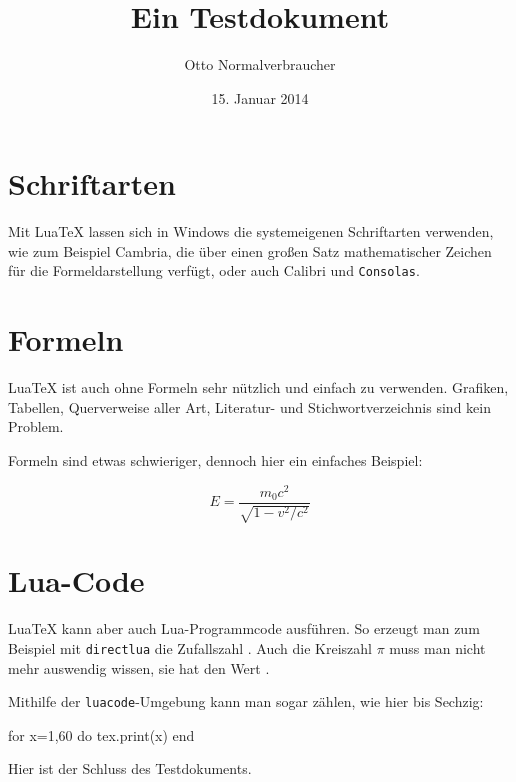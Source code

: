 \documentclass[a4paper]{scrartcl}
\title{Ein Testdokument}
\author{Otto Normalverbraucher}
\date{15. Januar 2014}
\begin{document}
 
\maketitle
\tableofcontents
 
\section{Schriftarten}
Mit Lua\TeX{} lassen sich in Windows die systemeigenen Schriftarten verwenden,
wie zum Beispiel Cambria, die über einen großen Satz mathematischer Zeichen für
die Formeldarstellung verfügt, oder auch \textsf{Calibri} und \texttt{Consolas}.
 
\section{Formeln}
Lua\TeX{} ist auch ohne Formeln sehr nützlich und einfach zu verwenden. Grafiken,
Tabellen, Querverweise aller Art, Literatur- und Stichwortverzeichnis sind
kein Problem.
 
Formeln sind etwas schwieriger, dennoch hier ein einfaches Beispiel:
 
\begin{displaymath}
  E = \frac{m_{0} c^{2}}{\sqrt{1-v^{2}/c^{2}}}
\end{displaymath}
 
\section{Lua-Code}
Lua\TeX{} kann aber auch Lua-Programmcode ausführen. So erzeugt man zum Beispiel
mit \texttt{directlua} die Zufallszahl .
Auch die Kreiszahl $\pi$ muss man nicht mehr auswendig wissen, sie hat den Wert
.
 
Mithilfe der \texttt{luacode}-Umgebung kann man sogar zählen, wie hier bis Sechzig:
\begin{luacode}
  for x=1,60 do
    tex.print(x)
  end
\end{luacode}
 
Hier ist der Schluss des Testdokuments.
 
\end{document}
